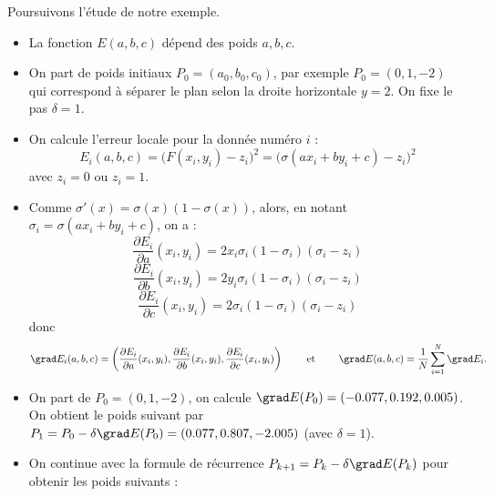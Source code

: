 \documentclass[11pt,class=report,crop=false]{standalone}
\begin{document}
\begin{exemple}
Poursuivons l'étude de notre exemple.
\begin{itemize}
  \item La fonction $E(a,b,c)$ dépend des poids $a,b,c$.
  
  \item On part de poids initiaux $P_0 = (a_0,b_0,c_0)$, par exemple $P_0 = (0,1,-2)$ qui correspond à séparer le plan selon la droite horizontale $y=2$. 
  On fixe le pas $\delta = 1$.
  
  \item On calcule l'erreur locale pour la donnée numéro $i$ :
  $$E_i(a,b,c) = \big( F(x_i,y_i) - z_i \big)^2 = \big( \sigma(ax_i + by_i + c) - z_i \big)^2$$
  avec $z_i = 0$ ou $z_i=1$.
   
  \item Comme $\sigma'(x)= \sigma(x)(1-\sigma(x))$, alors, en notant $\sigma_i = \sigma(ax_i+by_i+c)$, on a :
  $$\frac{\partial E_i}{\partial a}(x_i,y_i) = 2 x_i  \sigma_i(1-\sigma_i)(\sigma_i - z_i)$$
  $$\frac{\partial E_i}{\partial b}(x_i,y_i) = 2 y_i \sigma_i(1-\sigma_i)(\sigma_i - z_i)$$
  $$\frac{\partial E_i}{\partial c}(x_i,y_i) = 2 \sigma_i(1-\sigma_i)(\sigma_i - z_i)$$ 
  donc 
  $$\grad E_i(a,b,c) = \left(\frac{\partial E_i}{\partial a}(x_i,y_i), \frac{\partial E_i}{\partial b}(x_i,y_i), \frac{\partial E_i}{\partial c}(x_i,y_i) \right)
  \qquad \text{ et  } \qquad 
  \grad E(a,b,c) = \frac 1N \sum_{i=1}^N \grad E_i.$$
     
  \item On part de $P_0 = (0,1,-2)$, on calcule $\grad E(P_0) = (-0.077, 0.192, 0.005)$. On obtient le poids suivant par $P_1 = P_0 - \delta \grad E(P_0) = (0.077,    0.807,    -2.005)$ (avec $\delta = 1$).   
     
  \item On continue avec la formule de récurrence $P_{k+1} = P_k - \delta \grad E(P_k)$ pour obtenir les poids suivants :


\end{itemize}
\end{exemple}
\end{document}
